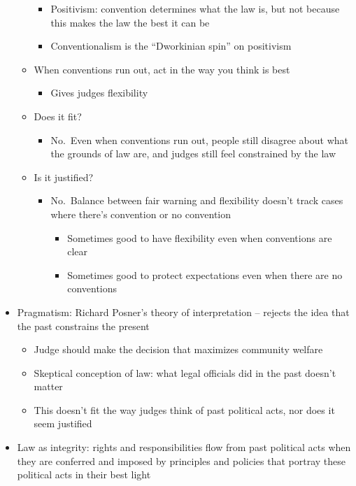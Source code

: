 \begin{itemize}
\begin{itemize}
    \begin{itemize}
    \tightlist
    \item
      Positivism: convention determines what the law is, but not because
      this makes the law the best it can be
    \item
      Conventionalism is the ``Dworkinian spin'' on positivism
    \end{itemize}
  \item
    When conventions run out, act in the way you think is best

    \begin{itemize}
    \tightlist
    \item
      Gives judges flexibility
    \end{itemize}
  \item
    Does it fit?

    \begin{itemize}
    \tightlist
    \item
      No.~Even when conventions run out, people still disagree about
      what the grounds of law are, and judges still feel constrained by
      the law
    \end{itemize}
  \item
    Is it justified?

    \begin{itemize}
    \tightlist
    \item
      No.~Balance between fair warning and flexibility doesn't track
      cases where there's convention or no convention

      \begin{itemize}
      \tightlist
      \item
        Sometimes good to have flexibility even when conventions are
        clear
      \item
        Sometimes good to protect expectations even when there are no
        conventions
      \end{itemize}
    \end{itemize}
  \end{itemize}
\item
  Pragmatism: Richard Posner's theory of interpretation -- rejects the
  idea that the past constrains the present

  \begin{itemize}
  \tightlist
  \item
    Judge should make the decision that maximizes community welfare
  \item
    Skeptical conception of law: what legal officials did in the past
    doesn't matter
  \item
    This doesn't fit the way judges think of past political acts, nor
    does it seem justified
  \end{itemize}
\item
  Law as integrity: rights and responsibilities flow from past political
  acts when they are conferred and imposed by principles and policies
  that portray these political acts in their best light


\end{itemize}
